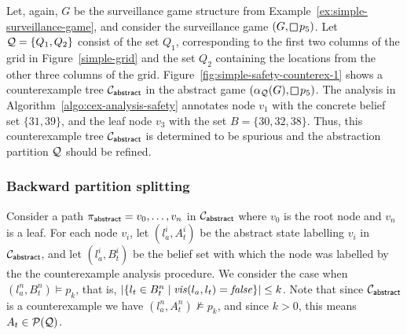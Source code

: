 \begin{example}\label{ex:simple-safety-unconcretizable}
Let, again, $G$ be the surveillance game structure from Example~\ref{ex:simple-surveillance-game}, and consider the surveillance game $(G,\LTLglobally p_5)$. 
Let $\mathcal{Q} = \{Q_1,Q_2\}$ consist of the set $Q_1$, corresponding to the first two columns of the grid in Figure~\ref{simple-grid} and the set $Q_2$ containing the locations from the other three columns of the grid. Figure~\ref{fig:simple-safety-counterex-1} shows a counterexample tree $\mathcal{C}_{\mathsf{abstract}}$ in the abstract game $(\alpha_\part(G),\LTLglobally p_5)$. The analysis in Algorithm~\ref{algo:cex-analysis-safety} annotates node $v_1$ with the concrete belief set $\{31,39\}$, and the leaf node $v_3$ with the set $B = \{30,32,38\}$. Thus, this counterexample tree $\mathcal{C}_{\mathsf{abstract}}$ is determined to be spurious and the abstraction partition $\mathcal{Q}$ should be refined.
\end{example}

\subsubsection{Backward partition splitting}
Consider a path $\pi_{\mathsf{abstract}} = v_0,\ldots, v_n$ in $\mathcal{C}_{\mathsf{abstract}}$ where $v_0$ is the root node and $v_n$ is a leaf. For each node $v_i$, let $(l_a^i,A_t^i) $ be the abstract state labelling $v_i$ in $\mathcal{C}_{\mathsf{abstract}}$, and let $(l_a^i,B_t^i)$ be the  belief set with which the node was labelled by the the counterexample analysis procedure. We consider the case when $(l_a^n,B_t^n) \models p_k$, that is, $|\{l_t \in B_t^n \mid \mathit{vis}(l_a,l_t) = \mathit{false}\}| \leq k$.
Note that since $\mathcal{C}_{\mathsf{abstract}}$ is a counterexample we have $(l_a^n,A_t^n) \not \models p_k$, and since $k>0$, this means $A_t \in \mathcal{P}(\mathcal{Q})$.


